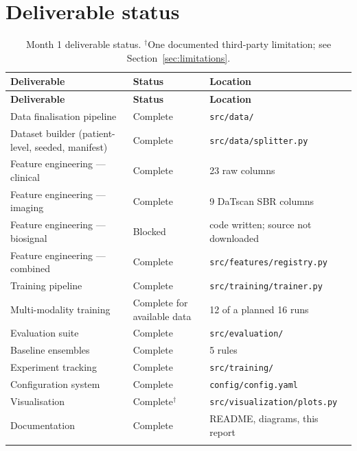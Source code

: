 \documentclass[11pt,a4paper]{article}
\newcommand{\code}[1]{\texttt{\small #1}}
\begin{document}
\section{Deliverable status}

\begin{longtable}{@{}p{6.6cm} p{2.6cm} p{5.4cm}@{}}
\toprule
\textbf{Deliverable} & \textbf{Status} & \textbf{Location} \\
\midrule
\endfirsthead
\toprule
\textbf{Deliverable} & \textbf{Status} & \textbf{Location} \\
\midrule
\endhead
Data finalisation pipeline            & Complete & \code{src/data/} \\
Dataset builder (patient-level, seeded, manifest) & Complete & \code{src/data/splitter.py} \\
Feature engineering --- clinical      & Complete & 23 raw columns \\
Feature engineering --- imaging       & Complete & 9 DaTscan SBR columns \\
Feature engineering --- biosignal     & \textcolor{warn}{Blocked} & code written; source not downloaded \\
Feature engineering --- combined      & Complete & \code{src/features/registry.py} \\
Training pipeline                     & Complete & \code{src/training/trainer.py} \\
Multi-modality training               & Complete for available data & 12 of a planned 16 runs \\
Evaluation suite                      & Complete & \code{src/evaluation/} \\
Baseline ensembles                    & Complete & 5 rules \\
Experiment tracking                   & Complete & \code{src/training/} \\
Configuration system                  & Complete & \code{config/config.yaml} \\
Visualisation                         & Complete$^{\dagger}$ & \code{src/visualization/plots.py} \\
Documentation                         & Complete & README, diagrams, this report \\
\bottomrule
\caption{Month 1 deliverable status. $^{\dagger}$One documented third-party
limitation; see Section~\ref{sec:limitations}.}
\label{tab:deliverables}
\end{longtable}
\end{document}

